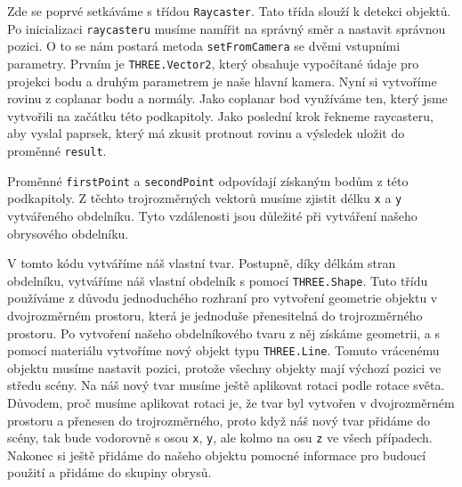 \documentclass[czech,bachelor,dept420,male,cpdeclaration]{diploma}
\begin{document}


Zde se poprvé setkáváme s třídou \texttt{Raycaster}. Tato třída slouží k detekci objektů. Po inicializaci \texttt{raycasteru} musíme namířit na správný směr a nastavit správnou pozici. O to se nám postará metoda \texttt{setFromCamera} se dvěmi vstupními parametry. Prvním je \texttt{THREE.Vector2}, který obsahuje vypočítané údaje pro projekci bodu a druhým parametrem je naše hlavní kamera. Nyní si vytvoříme rovinu z coplanar bodu a normály. Jako coplanar bod využíváme ten, který jsme vytvořili na začátku této podkapitoly. Jako poslední krok řekneme raycasteru, aby vyslal paprsek, který má zkusit protnout rovinu a výsledek uložit do proměnné \texttt{result}.

\begin{minipage}{\linewidth}
  
\end{minipage}

Proměnné \texttt{firstPoint} a \texttt{secondPoint} odpovídají získaným bodům z této podkapitoly. Z těchto trojrozměrných vektorů musíme zjistit délku \texttt{x} a \texttt{y} vytvářeného obdelníku. Tyto vzdálenosti jsou důležité při vytváření našeho obrysového obdelníku. 

 

V tomto kódu vytváříme náš vlastní tvar. Postupně, díky délkám stran obdelníku, vytváříme náš vlastní obdelník s pomocí \texttt{THREE.Shape}. Tuto třídu používáme z důvodu jednoduchého rozhraní pro vytvoření geometrie objektu v dvojrozměrném prostoru, která je jednoduše přenesitelná do trojrozměrného prostoru. Po vytvoření našeho obdelníkového tvaru z něj získáme geometrii, a s pomocí materiálu vytvoříme nový objekt typu \texttt{THREE.Line}. Tomuto vrácenému objektu musíme nastavit pozici, protože všechny objekty mají výchozí pozici ve středu scény. Na náš nový tvar musíme ještě aplikovat rotaci podle rotace světa. Důvodem, proč musíme aplikovat rotaci je, že tvar byl vytvořen v dvojrozměrném prostoru a přenesen do trojrozměrného, proto když náš nový tvar přidáme do scény, tak bude vodorovně s osou \texttt{x}, \texttt{y}, ale kolmo na osu \texttt{z} ve všech případech. Nakonec si ještě přidáme do našeho objektu pomocné informace pro budoucí použití a přidáme do skupiny obrysů.
\end{document}
